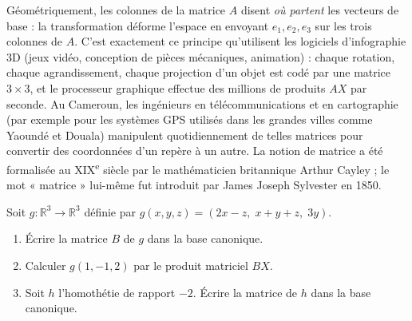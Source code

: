 \documentclass[11pt]{article}
\begin{document}
\begin{savaistu}
Géométriquement, les colonnes de la matrice $A$ disent \emph{où partent} les vecteurs de base : la transformation déforme l'espace en envoyant $e_1, e_2, e_3$ sur les trois colonnes de $A$. C'est exactement ce principe qu'utilisent les logiciels d'infographie 3D (jeux vidéo, conception de pièces mécaniques, animation) : chaque rotation, chaque agrandissement, chaque projection d'un objet est codé par une matrice $3 \times 3$, et le processeur graphique effectue des millions de produits $AX$ par seconde. Au Cameroun, les ingénieurs en télécommunications et en cartographie (par exemple pour les systèmes GPS utilisés dans les grandes villes comme Yaoundé et Douala) manipulent quotidiennement de telles matrices pour convertir des coordonnées d'un repère à un autre. La notion de matrice a été formalisée au XIX\textsuperscript{e} siècle par le mathématicien britannique Arthur Cayley ; le mot « matrice » lui-même fut introduit par James Joseph Sylvester en 1850.
\end{savaistu}

\begin{exercice}
Soit $g : \mathbb{R}^3 \to \mathbb{R}^3$ définie par $g(x, y, z) = (2x - z,\; x + y + z,\; 3y)$.
\begin{enumerate}
\item Écrire la matrice $B$ de $g$ dans la base canonique.
\item Calculer $g(1, -1, 2)$ par le produit matriciel $BX$.
\item Soit $h$ l'homothétie de rapport $-2$. Écrire la matrice de $h$ dans la base canonique.
\end{enumerate}
\end{exercice}
\end{document}
